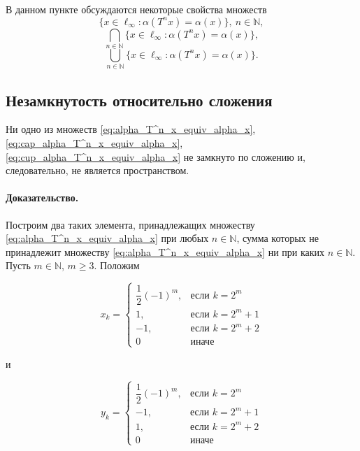 В данном пункте обсуждаются некоторые свойства множеств
\begin{equation}
	\label{eq:alpha_T^n_x_equiv_alpha_x}
	\{x \in \ell_\infty : \alpha(T^n x) = \alpha(x) \}, ~n\in\mathbb{N},
\end{equation}
\begin{equation}
	\label{eq:cap_alpha_T^n_x_equiv_alpha_x}
	\bigcap\limits_{n\in\mathbb{N}}\{x \in \ell_\infty : \alpha(T^n x) = \alpha(x) \}
	,
\end{equation}
\begin{equation}
	\label{eq:cup_alpha_T^n_x_equiv_alpha_x}
	\bigcup_{n\in\mathbb{N}}\{x \in \ell_\infty : \alpha(T^n x) = \alpha(x) \}
	.
\end{equation}

\subsection{Незамкнутость относительно сложения}

\begin{theorem}
	Ни одно из множеств
	\eqref{eq:alpha_T^n_x_equiv_alpha_x}, \eqref{eq:cap_alpha_T^n_x_equiv_alpha_x}, \eqref{eq:cup_alpha_T^n_x_equiv_alpha_x}
	не замкнуто по сложению и, следовательно, не является пространством.
\end{theorem}

\paragraph{Доказательство.}
Построим два таких элемента, принадлежащих множеству \eqref{eq:alpha_T^n_x_equiv_alpha_x} при любых $n\in\mathbb{N}$,
сумма которых не принадлежит множеству \eqref{eq:alpha_T^n_x_equiv_alpha_x} ни при каких $n\in\mathbb{N}$.
Пусть $m\in\mathbb{N}$, $m \geq 3$.
Положим

\begin{equation}
	x_k = \begin{cases}
		\dfrac{1}{2}(-1)^m,  & \mbox{если } k = 2^m     \\
		1,                   & \mbox{если } k = 2^m + 1 \\
		-1,                  & \mbox{если } k = 2^m + 2 \\
		0                    & \mbox{иначе }
	\end{cases}
\end{equation}

и

\begin{equation}
	y_k = \begin{cases}
		\dfrac{1}{2}(-1)^m,  & \mbox{если } k = 2^m     \\
		-1,                  & \mbox{если } k = 2^m + 1 \\
		1,                   & \mbox{если } k = 2^m + 2 \\
		0                    & \mbox{иначе }
	\end{cases}
\end{equation}

